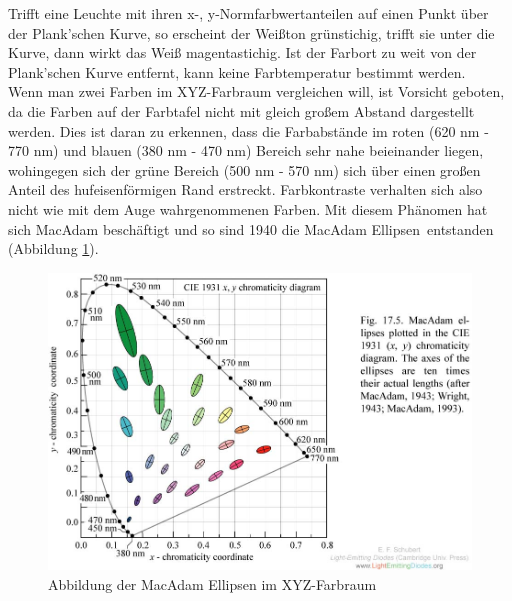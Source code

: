 
\noindent Trifft eine Leuchte mit ihren x-, y-Normfarbwertanteilen auf einen Punkt über der Plank'schen Kurve, so erscheint der Weißton grünstichig, trifft sie unter die Kurve, dann wirkt das Weiß magentastichig. Ist der Farbort zu weit von der Plank'schen Kurve entfernt, kann keine Farbtemperatur bestimmt werden.\\
Wenn man zwei Farben im XYZ-Farbraum vergleichen will, ist Vorsicht geboten, da die Farben auf der Farbtafel nicht mit gleich großem Abstand dargestellt werden. Dies ist daran zu erkennen, dass die Farbabstände im roten (620 nm - 770 nm) und blauen (380 nm - 470 nm) Bereich sehr nahe beieinander liegen, wohingegen sich der grüne Bereich (500 nm - 570 nm) sich über einen großen Anteil des hufeisenförmigen Rand erstreckt. Farbkontraste verhalten sich also nicht wie mit dem Auge wahrgenommenen Farben. Mit diesem Phänomen hat sich MacAdam beschäftigt und so sind 1940 die \glqq MacAdam Ellipsen\grqq\ entstanden (Abbildung \ref{b_ellipsen}).

\begin{figure}[H]     %
\centering
\includegraphics[width=1.0\textwidth]{bilder/ellipsen} 
\caption {Abbildung der MacAdam Ellipsen im XYZ-Farbraum\protect\footnotemark}\label{b_ellipsen}
\end{figure}

